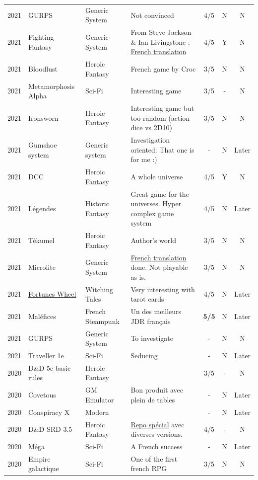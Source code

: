 \documentclass[a4paper, 11pt, twoside]{article}
\begin{document}
\begin{longtable}{cp{2cm}p{1.5cm}p{7cm}ccc}
2021 & GURPS & Generic System & Not convinced & 4/5 & N & N\\
2021 & Fighting Fantasy & Generic System & From Steve Jackson \& Ian Livingstone : \href{https://github.com/orey/jdr/tree/master/FightingFantasys-fr}{French translation} & 4/5 & Y & N\\
2021 & Bloodlust & Heroic Fantasy & French game by Croc & 3/5 & N & N\\
2021 & Metamorphosis Alpha & Sci-Fi & Interesting game & 3/5 & - & N\\
2021 & Ironsworn & Heroic Fantasy & Interesting game but too random (action dice vs 2D10) & 3/5 & N & N\\
2021 & Gumshoe system & Generic system & Investigation oriented: That one is for me :) & - & N & Later\\
2021 & DCC & Heroic Fantasy & A whole universe & 4/5 & Y & N\\
2021 & Légendes & Historic Fantasy & Great game for the universes. Hyper complex game system & 4/5 & N & Later\\
2021 & Tékumel & Heroic Fantasy & Author's world & 3/5 & N & N\\
2021 & Microlite & Generic System & \href{https://github.com/orey/jdr/tree/master/Microlite20-fr}{French translation} done. Not playable as-is. & 3/5 & N & N\\
2021 & \href{http://www.fortuneswheel.co.uk/}{Fortunes Wheel} & Witching Tales & Very interesting with tarot cards & 4/5 & N & Later\\
2021 & Maléfices & French Steampunk & Un des meilleurs JDR français & \textbf{5/5} & N & Later\\
2021 & GURPS & Generic System & To investigate & - & N & N\\
2021 & Traveller 1e & Sci-Fi & Seducing & - & N & Later\\
2020 & D\&D 5e basic rules & Heroic Fantasy &  & 3/5 & - & N\\
2020 & Covetous & GM Emulator & Bon produit avec plein de tables & - & N & Later\\
2020 & Conspiracy X & Modern &  & - & N & Later\\
2020 & D\&D SRD 3.5 & Heroic Fantasy & \href{https://github.com/orey/srd-3.5}{Repo spécial} avec diverses versions. & 4/5 & - & N\\
2020 & Méga & Sci-Fi & A French success & - & N & Later\\
2020 & Empire galactique & Sci-Fi & One of the first french RPG & 3/5 & N & N\\

\end{longtable}
\end{document}
